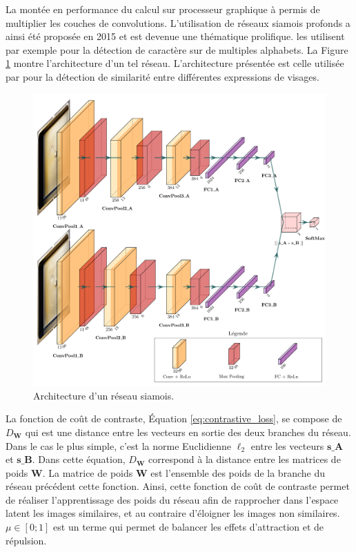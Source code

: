 La montée en performance du calcul sur processeur graphique à permis de multiplier les couches de convolutions.
L'utilisation de réseaux siamois profonds a ainsi été proposée en 2015 et est devenue une thématique prolifique.
\cite{koch_siamese_2015} les utilisent par exemple pour la détection de caractère sur de multiples alphabets.
La Figure \ref{fig:siamese} montre l'architecture d'un tel réseau.
L'architecture présentée est celle utilisée par \cite{rao_deep_2016} pour la détection de similarité entre différentes expressions de visages.

\begin{figure}[hbtp]
    \centering
    \includegraphics[width=\textwidth,height=\textheight,keepaspectratio]{../Chap3/Figures/siamese.pdf}
    \caption{Architecture d'un réseau siamois.}
    \label{fig:siamese}
\end{figure}

La fonction de coût de contraste, Équation \ref{eq:contrastive_loss}, se compose de $D_{\mathbf{W}}$ qui est une distance entre les vecteurs en sortie des deux branches du réseau.
Dans le cas le plus simple, c'est la norme Euclidienne $\ell_{2}$ entre les vecteurs $\mathbf{s\_A}$ et $\mathbf{s\_B}$.
Dans cette équation, $D_{\mathbf{W}}$ correspond à la distance entre les matrices de poids $\mathbf{W}$.
La matrice de poids $\mathbf{W}$ est l'ensemble des poids de la branche du réseau précédent cette fonction.
Ainsi, cette fonction de coût de contraste permet de réaliser l'apprentissage des poids du réseau afin de rapprocher dans l'espace latent les images similaires, et au contraire d'éloigner les images non similaires. $\mu \in [0 ; 1]$ est un terme qui permet de balancer les effets d'attraction et de répulsion.

